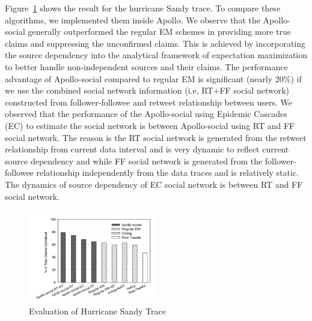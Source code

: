 \documentclass[a4paper,12pt]{article}
\begin{document}
Figure~\ref{fig:mle-eval} shows the result for the hurricane Sandy trace. To compare these algorithms, we implemented them inside Apollo. We observe that the Apollo-social generally outperformed the regular EM schemes in providing more true claims and suppressing the unconfirmed claims. This is achieved by incorporating the source dependency into the analytical framework of expectation maximization to better handle non-independent sources and their claims. The performance advantage of Apollo-social compared to regular EM is significant (nearly 20\%) if we use the combined social network information (i.e, RT+FF social network) constructed from follower-followee and retweet relationship between users. We observed that the performance of the Apollo-social using Epidemic Cascades (EC) to estimate the social network is between Apollo-social using RT and FF social network. The reason is the RT social network is generated from the retweet relationship from current data interval and is very dynamic to reflect current source dependency and while FF social network is generated from the follower-followee relationship independently from the data traces and is relatively static. The dynamics of source dependency of EC social network is between RT and FF social network.

\begin{figure}[H]
  \centering
  \includegraphics[width=0.5\textwidth]{img/mle-eval}
  \caption{\label{fig:mle-eval} Evaluation of Hurricane Sandy Trace}
\end{figure}
\end{document}

